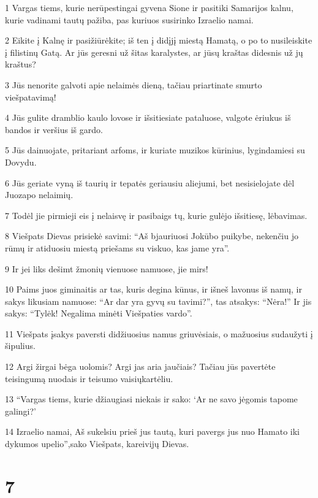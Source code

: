 \par 1 Vargas tiems, kurie nerūpestingai gyvena Sione ir pasitiki Samarijos kalnu, kurie vadinami tautų pažiba, pas kuriuos susirinko Izraelio namai. 
\par 2 Eikite į Kalnę ir pasižiūrėkite; iš ten į didįjį miestą Hamatą, o po to nusileiskite į filistinų Gatą. Ar jūs geresni už šitas karalystes, ar jūsų kraštas didesnis už jų kraštus? 
\par 3 Jūs nenorite galvoti apie nelaimės dieną, tačiau priartinate smurto viešpatavimą! 
\par 4 Jūs gulite dramblio kaulo lovose ir išsitiesiate pataluose, valgote ėriukus iš bandos ir veršius iš gardo. 
\par 5 Jūs dainuojate, pritariant arfoms, ir kuriate muzikos kūrinius, lygindamiesi su Dovydu. 
\par 6 Jūs geriate vyną iš taurių ir tepatės geriausiu aliejumi, bet nesisielojate dėl Juozapo nelaimių. 
\par 7 Todėl jie pirmieji eis į nelaisvę ir pasibaigs tų, kurie gulėjo išsitiesę, lėbavimas. 
\par 8 Viešpats Dievas prisiekė savimi: “Aš bjauriuosi Jokūbo puikybe, nekenčiu jo rūmų ir atiduosiu miestą priešams su viskuo, kas jame yra”. 
\par 9 Ir jei liks dešimt žmonių vienuose namuose, jie mirs! 
\par 10 Paims juos giminaitis ar tas, kuris degina kūnus, ir išneš lavonus iš namų, ir sakys likusiam namuose: “Ar dar yra gyvų su tavimi?”, tas atsakys: “Nėra!” Ir jis sakys: “Tylėk! Negalima minėti Viešpaties vardo”. 
\par 11 Viešpats įsakys paversti didžiuosius namus griuvėsiais, o mažuosius sudaužyti į šipulius. 
\par 12 Argi žirgai bėga uolomis? Argi jas aria jaučiais? Tačiau jūs pavertėte teisingumą nuodais ir teisumo vaisių­kartėliu. 
\par 13 “Vargas tiems, kurie džiaugiasi niekais ir sako: ‘Ar ne savo jėgomis tapome galingi?’ 
\par 14 Izraelio namai, Aš sukelsiu prieš jus tautą, kuri pavergs jus nuo Hamato iki dykumos upelio”,­sako Viešpats, kareivijų Dievas.



\chapter{7}


